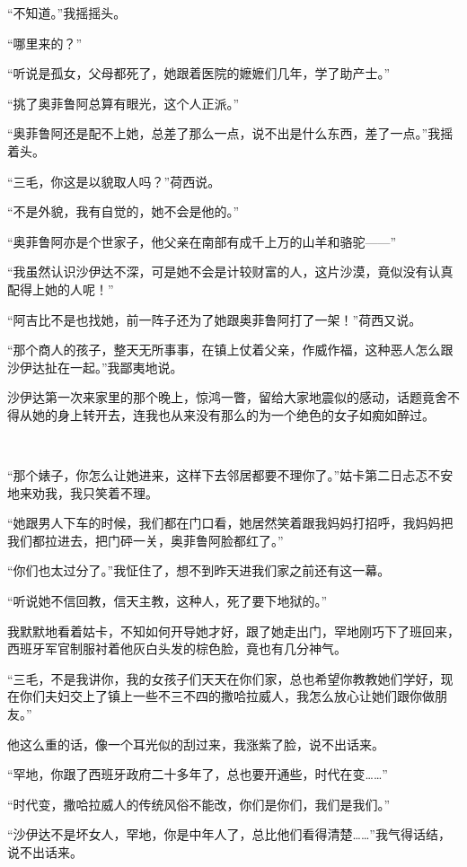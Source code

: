\par “不知道。”我摇摇头。
\par “哪里来的？”
\par “听说是孤女，父母都死了，她跟着医院的嬷嬷们几年，学了助产士。”
\par “挑了奥菲鲁阿总算有眼光，这个人正派。”
\par “奥菲鲁阿还是配不上她，总差了那么一点，说不出是什么东西，差了一点。”我摇着头。
\par “三毛，你这是以貌取人吗？”荷西说。
\par “不是外貌，我有自觉的，她不会是他的。”
\par “奥菲鲁阿亦是个世家子，他父亲在南部有成千上万的山羊和骆驼——”
\par “我虽然认识沙伊达不深，可是她不会是计较财富的人，这片沙漠，竟似没有认真配得上她的人呢！”
\par “阿吉比不是也找她，前一阵子还为了她跟奥菲鲁阿打了一架！”荷西又说。
\par “那个商人的孩子，整天无所事事，在镇上仗着父亲，作威作福，这种恶人怎么跟沙伊达扯在一起。”我鄙夷地说。
\par 沙伊达第一次来家里的那个晚上，惊鸿一瞥，留给大家地震似的感动，话题竟舍不得从她的身上转开去，连我也从来没有那么的为一个绝色的女子如痴如醉过。
\par  
\par “那个婊子，你怎么让她进来，这样下去邻居都要不理你了。”姑卡第二日忐忑不安地来劝我，我只笑着不理。
\par “她跟男人下车的时候，我们都在门口看，她居然笑着跟我妈妈打招呼，我妈妈把我们都拉进去，把门砰一关，奥菲鲁阿脸都红了。”
\par “你们也太过分了。”我怔住了，想不到昨天进我们家之前还有这一幕。
\par “听说她不信回教，信天主教，这种人，死了要下地狱的。”
\par 我默默地看着姑卡，不知如何开导她才好，跟了她走出门，罕地刚巧下了班回来，西班牙军官制服衬着他灰白头发的棕色脸，竟也有几分神气。
\par “三毛，不是我讲你，我的女孩子们天天在你们家，总也希望你教教她们学好，现在你们夫妇交上了镇上一些不三不四的撒哈拉威人，我怎么放心让她们跟你做朋友。”
\par 他这么重的话，像一个耳光似的刮过来，我涨紫了脸，说不出话来。
\par “罕地，你跟了西班牙政府二十多年了，总也要开通些，时代在变……”
\par “时代变，撒哈拉威人的传统风俗不能改，你们是你们，我们是我们。”
\par “沙伊达不是坏女人，罕地，你是中年人了，总比他们看得清楚……”我气得话结，说不出话来。

